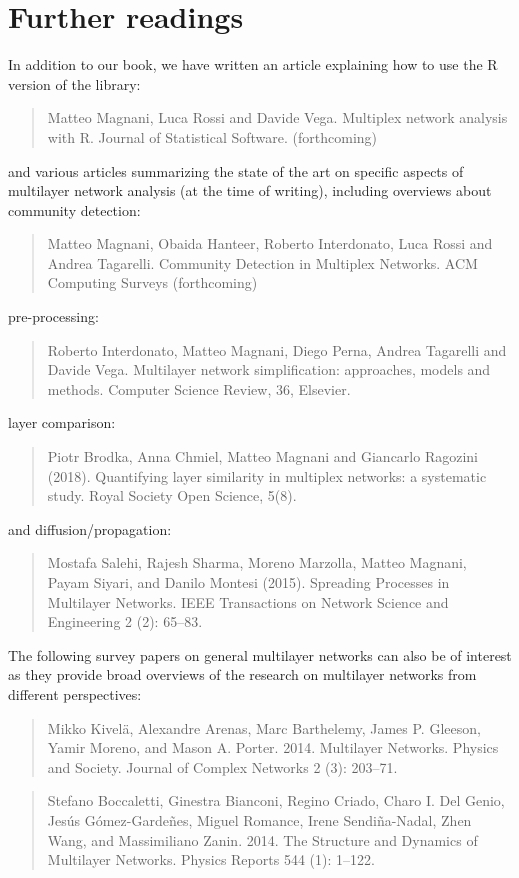 \chapter{Further readings} \label{ch:readings}

In addition to our book, we have written an article explaining how to use the R version of the library:
\begin{quote}
Matteo Magnani, Luca Rossi and Davide Vega. Multiplex network analysis with R. Journal of Statistical Software. (forthcoming) 
\end{quote}
and various articles summarizing the state of the art on specific aspects of multilayer network analysis (at the time of writing), including overviews about community detection: 
\begin{quote}
Matteo Magnani, Obaida Hanteer, Roberto Interdonato, Luca Rossi and Andrea Tagarelli. Community Detection in Multiplex Networks. ACM Computing Surveys (forthcoming) 
\end{quote}
pre-processing:
\begin{quote}
Roberto Interdonato, Matteo Magnani, Diego Perna, Andrea Tagarelli and Davide Vega. Multilayer network simplification: approaches, models and methods. Computer Science Review, 36, Elsevier.
\end{quote}
layer comparison:
\begin{quote}
Piotr Brodka, Anna Chmiel, Matteo Magnani and Giancarlo Ragozini (2018). Quantifying layer similarity in multiplex networks: a systematic study. Royal Society Open Science, 5(8). 
\end{quote}
and diffusion/propagation:
\begin{quote}
Mostafa Salehi, Rajesh Sharma, Moreno Marzolla, Matteo Magnani, Payam Siyari, and Danilo Montesi (2015). Spreading Processes in Multilayer Networks. IEEE Transactions on Network Science and Engineering 2 (2): 65--83.
\end{quote}

The following survey papers on general multilayer networks can also be of interest as they provide broad overviews of the research on multilayer networks from different perspectives: 

\begin{quote}
Mikko Kivel\"a, Alexandre Arenas, Marc Barthelemy, James P. Gleeson, Yamir Moreno, and Mason A. Porter. 2014. Multilayer Networks. Physics and Society. Journal of Complex Networks 2 (3): 203--71. 
\end{quote}

\begin{quote}
Stefano Boccaletti, Ginestra Bianconi, Regino Criado, Charo I. Del Genio, Jes\'us G\'omez-Garde\~nes, Miguel Romance, Irene Sendi\~na-Nadal, Zhen Wang, and Massimiliano Zanin. 2014. The Structure and Dynamics of Multilayer Networks. Physics Reports 544 (1): 1--122.
\end{quote}